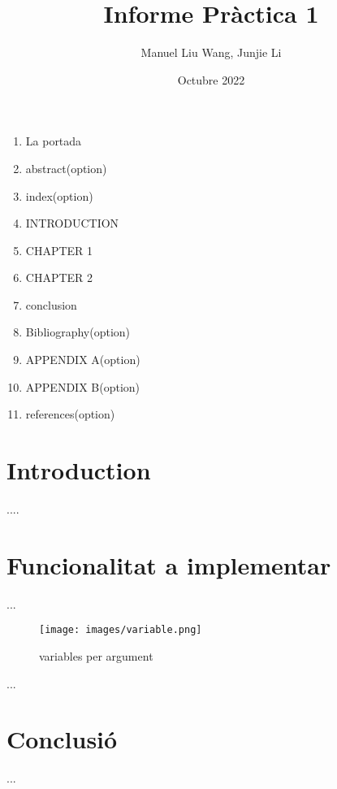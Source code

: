 \documentclass{article}
\title{Informe Pràctica 1}
\author{Manuel Liu Wang, Junjie Li}
\date{Octubre 2022}
\begin{document}













\begin{enumerate}
  \item La portada
  \item abstract(option)
  \item index(option)
  \item INTRODUCTION
  \item CHAPTER 1
  \item CHAPTER 2
  \item conclusion
  \item Bibliography(option)
  \item APPENDIX A(option)
  \item APPENDIX B(option)
  \item references(option)
\end{enumerate}





\section{Introduction}


....
 
\section{Funcionalitat a implementar}

...

\begin{figure}[H]
    \centering
    \texttt{[image: images/variable.png]}
    \caption{variables per argument}
    \label{taula}
\end{figure}%



...


\section{Conclusió}

...








 
\end{document}
